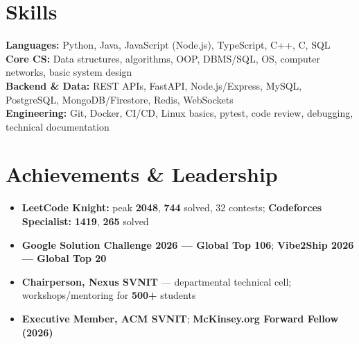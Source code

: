 \documentclass[a4paper,10pt]{article}
\begin{document}
\section{Skills}
\noindent\small
\textbf{Languages:} Python, Java, JavaScript (Node.js), TypeScript, C++, C, SQL \\[0.5mm]
\textbf{Core CS:} Data structures, algorithms, OOP, DBMS/SQL, OS, computer networks, basic system design \\[0.5mm]
\textbf{Backend \& Data:} REST APIs, FastAPI, Node.js/Express, MySQL, PostgreSQL, MongoDB/Firestore, Redis, WebSockets \\[0.5mm]
\textbf{Engineering:} Git, Docker, CI/CD, Linux basics, pytest, code review, debugging, technical documentation

\section{Achievements \& Leadership}
\begin{itemize}
  \item \textbf{LeetCode Knight:} peak \textbf{2048}, \textbf{744} solved, 32 contests; \textbf{Codeforces Specialist:} \textbf{1419}, \textbf{265} solved
  \item \textbf{Google Solution Challenge 2026 --- Global Top 106}; \textbf{Vibe2Ship 2026 --- Global Top 20}
  \item \textbf{Chairperson, Nexus SVNIT} --- departmental technical cell; workshops/mentoring for \textbf{500+} students
  \item \textbf{Executive Member, ACM SVNIT}; \textbf{McKinsey.org Forward Fellow (2026)}
\end{itemize}
\end{document}
